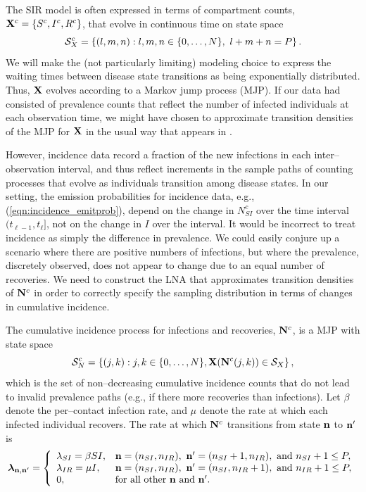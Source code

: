 The SIR model is often expressed in terms of compartment counts, $ \mathbf{X}^c = \lbrace S^c,I^c,R^c\rbrace $, that evolve in continuous time on state space $$ \mathcal{S}_X^c = \left \lbrace (l,m,n):l,m,n\in\lbrace0,\dots,N\rbrace,\ l+m+n=P\right \rbrace. $$ We will make the (not particularly limiting) modeling choice to express the waiting times between disease state transitions as being exponentially distributed. Thus, $ \mathbf{X} $ evolves according to a Markov jump process (MJP). If our data had consisted of prevalence counts that reflect the number of infected individuals at each observation time, we might have chosen to approximate transition densities of the MJP for $ \mathbf{X} $ in the usual way that appears in \cite{komorowski2009,fearnhead2014,ross2009parameter}. 

However, incidence data record a fraction of the new infections in each inter--observation interval, and thus reflect increments in the sample paths of counting processes that evolve as individuals transition among disease states.
In our setting, the emission probabilities for incidence data, e.g., (\ref{eqn:incidence_emitprob}), depend on the change in $ N_{SI}^c $ over the time interval $ (t_{\ell-1},t_\ell] $, not on the change in $ I $ over the interval. It would be incorrect to treat incidence as simply the difference in prevalence. We could easily conjure up a scenario where there are positive numbers of infections, but where the prevalence, discretely observed, does not appear to change due to an equal number of recoveries. We need to construct the LNA that approximates transition densities of $ \mathbf{N}^c $ in order to correctly specify the sampling distribution in terms of changes in cumulative incidence.

The cumulative incidence process for infections and recoveries, $ \mathbf{N}^c $, is a MJP with state space $$ \mathcal{S}_N^c = \left \lbrace (j, k):j,k\in\lbrace0,\dots,N\rbrace,\mathbf{X}(\mathbf{N}^c(j,k)) \in \mathcal{S}_X\right \rbrace, $$ which is the set of non--decreasing cumulative incidence counts that do not lead to invalid prevalence paths (e.g., if there more recoveries than infections). Let $ \beta $ denote the per--contact infection rate, and $ \mu $ denote the rate at which each infected individual recovers. The rate at which $ \mathbf{N}^c $ transitions from state $ \mathbf{n} $ to $ \mathbf{n}^{\prime}$ is 
\begin{equation}
	\label{eqn:lna_sir_rates}
	\boldsymbol{\lambda}_{\mathbf{n},\mathbf{n}^\prime} = \left \lbrace \begin{array}{ll}
	\lambda_{SI} = \beta S I, & \mathbf{n} = (n_{SI},n_{IR}),\ \mathbf{n}^\prime = (n_{SI}+1,n_{IR}),\text{ and } n_{SI}+1\leq P, \\
	 \lambda_{IR} = \mu I, &  \mathbf{n} = (n_{SI},n_{IR}),\  \mathbf{n}^\prime = (n_{SI},n_{IR}+1),\text{ and } n_{IR}+1\leq P, \\
	 0, & \text{for all other } \mathbf{n} \text{ and } \mathbf{n}^\prime.
	\end{array} \right.
\end{equation}

